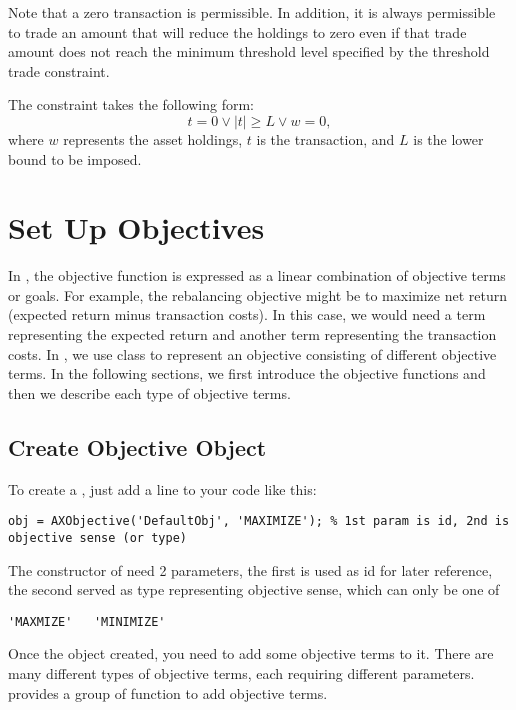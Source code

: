    Note that a zero transaction is permissible. 
   In addition, it is always permissible to trade an amount that will reduce the holdings to zero 
   even if that trade amount does not reach the minimum threshold level specified by the threshold trade constraint. 

   The constraint takes the following form: 
   \[
      t = 0 \vee |t| \ge L \vee w = 0,
   \]
   where $w$ represents the asset holdings, $t$ is the transaction, and $L$ is the lower bound to be imposed.


\section{Set Up Objectives}

In \axioma, the objective function is expressed as a linear combination of objective terms or goals. 
For example, the rebalancing objective might be to maximize net return (expected return minus transaction costs).
In this case, we would need a term representing the expected return and another term representing the transaction costs.
In \matlab, we use class  to represent an objective consisting of different objective terms.
In the following sections, we first introduce the objective functions and then we describe each type of objective terms.

\subsection{Create Objective Object}

To create a , just add a line to your code like this:
\begin{lstlisting}[numbers=none]
    obj = AXObjective('DefaultObj', 'MAXIMIZE'); % 1st param is id, 2nd is objective sense (or type)
\end{lstlisting}

The constructor of  need 2 parameters, the first is used as id for later reference,
the second served as type representing objective sense, which can only be one of
\begin{lstlisting}[numbers=none]
    'MAXMIZE'   'MINIMIZE'
\end{lstlisting}

Once the object created, you need to add some objective terms to it.
There are many different types of objective terms, each requiring different parameters.
 provides a group of function to add objective terms.

